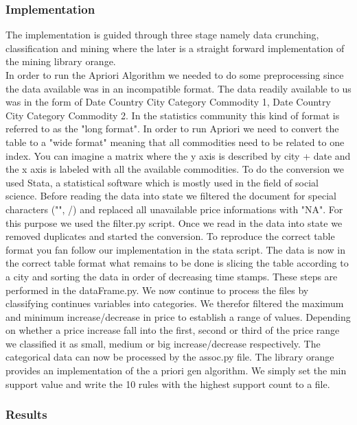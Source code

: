 \subsubsection{Implementation}

The implementation is guided through three stage namely data crunching, classification and  mining where the later is a straight forward implementation of the mining library orange. \\



In order to run the Apriori Algorithm we needed to do some preprocessing since the data available was in an incompatible format. The data readily available to us was in the form
of Date Country City Category Commodity 1, Date Country City Category Commodity 2. In the statistics community this kind of format is referred to as the "long format". In order to run Apriori we need to convert the table to a "wide format" meaning that all commodities need to be related to one index. You can imagine a matrix where the y axis is described by city + date and the x axis is labeled with all the available commodities. To do the conversion we used Stata, a statistical software which is mostly used in the field of social science. Before reading the data into state we filtered the document for special characters ("", /) and replaced all unavailable price informations with "NA". For this purpose we used the filter.py script. Once we read in the data into state we removed duplicates and started the conversion. To reproduce the correct table format you fan follow our implementation in the stata script.  The data is now in the correct table format what remains to be done is slicing the table according to a city and sorting the data in order of decreasing time stamps. These steps are performed in the dataFrame.py. We now continue to process the files by classifying continues variables into categories. We therefor filtered the maximum and minimum increase/decrease in price to establish a range of values. Depending on whether a price increase fall into the first, second or third of the price range we classified it as small, medium or big increase/decrease respectively. The categorical data can now be processed by the assoc.py file. The library orange provides an implementation of the a priori gen algorithm. We simply set the min support value and write the 10 rules with the highest support count to a file.

\subsubsection{Results}

